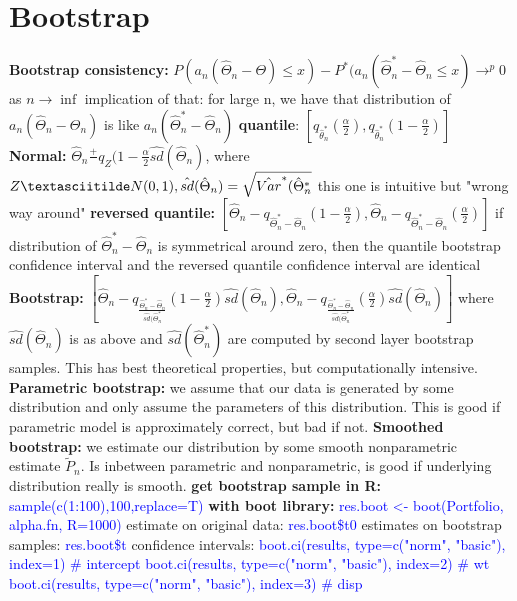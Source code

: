 \section{Bootstrap}
\textbf{Bootstrap consistency: }$P(a_n(\hat\Theta_n-\Theta) \leq x)-P^*(a_n(\hat\Theta_n^*-\hat\Theta_n \leq x) \rightarrow^p 0$ as $n \rightarrow \inf$ implication of that: for large n, we have that distribution of $a_n(\hat\Theta_n - \Theta_n)$ is like $a_n(\hat\Theta^*_n- \hat\Theta_n)$
\textbf{quantile}: $[q_{\hat\theta_n^*}(\frac{\alpha}{2}),q_{\hat\theta_n^*}(1-\frac{\alpha}{2})]$
\textbf{Normal: }$\hat\Theta_n \frac{+}{} q_Z(1-\frac{\alpha}{2}\hat{sd}(\hat\Theta_n)$, where $Z \textasciitilde N(0,1), \hat{sd}(\hat \Theta_n) = \sqrt{\hat{Var}^*(\hat{\Theta}_n^*}$ this one is intuitive but "wrong way around"
\textbf{reversed quantile: } $[\hat\Theta_n - q_{\hat\Theta_n^*-\hat\Theta_n}(1-\frac{\alpha}{2}), \hat\Theta_n - q_{\hat\Theta_n^*-\hat\Theta_n}(\frac{\alpha}{2})]$  if distribution of $\hat \Theta_n^*- \hat \Theta_n$ is symmetrical around zero, then the quantile bootstrap confidence interval and the reversed quantile confidence interval are identical 
\textbf{Bootstrap: }$[\hat\Theta_n - q_{\frac{\hat\Theta_n^*-\hat\Theta_n}{\hat{sd}(\hat\Theta_n^*}}(1-\frac{\alpha}{2})\hat{sd}(\hat\Theta_n), \hat\Theta_n - q_{\frac{\hat\Theta_n^*-\hat\Theta_n}{\hat{sd}(\hat\Theta_n^*}}(\frac{\alpha}{2})\hat{sd}(\hat\Theta_n)]$ where $\hat{sd}(\hat\Theta_n)$ is as above and $\hat{sd}(\hat\Theta_n^*)$ are computed by second layer bootstrap samples. This has best theoretical properties, but computationally intensive. 
\textbf{Parametric bootstrap: } we assume that our data is generated by some distribution and only assume the parameters of this distribution. This is good if parametric model is approximately correct, but bad if not. 
\textbf{Smoothed bootstrap: } we estimate our distribution by some smooth nonparametric estimate $\tilde P_n$. Is inbetween parametric and nonparametric, is good if underlying distribution really is smooth. 
\textbf{get bootstrap sample in R: } \textcolor{blue}{sample(c(1:100),100,replace=T)} \textbf{with boot library: } \textcolor{blue}{res.boot <- boot(Portfolio, alpha.fn, R=1000)} estimate on original data: \textcolor{blue}{res.boot\$t0 } estimates on bootstrap samples: \textcolor{blue}{res.boot\$t} confidence intervals: \textcolor{blue}{boot.ci(results, type=c("norm", "basic"), index=1) \# intercept 
boot.ci(results, type=c("norm", "basic"), index=2) \# wt 
boot.ci(results, type=c("norm", "basic"), index=3) \# disp
}